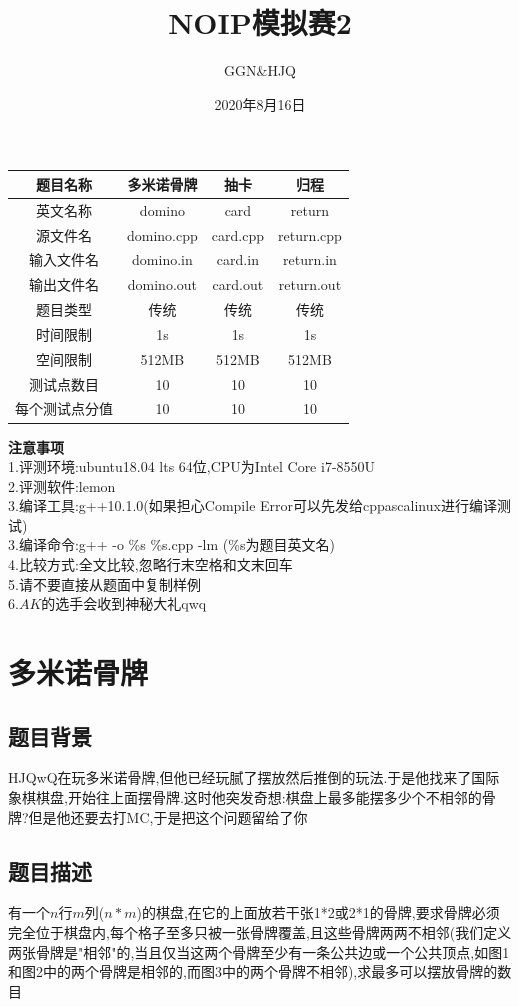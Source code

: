 \documentclass[12pt]{ctexart}
\title{\textbf{NOIP模拟赛2}}
\author{GGN\&HJQ}
\date{2020年8月16日}
\begin{document}
	\maketitle
	\begin{center}
		\begin{tabular}{|c|c|c|c|}
			\hline 题目名称&多米诺骨牌&抽卡&归程\\
			\hline 英文名称&domino&card&return\\
			\hline 源文件名&domino.cpp&card.cpp&return.cpp\\
			\hline 输入文件名&domino.in&card.in&return.in\\
			\hline 输出文件名&domino.out&card.out&return.out\\
			\hline 题目类型&传统&传统&传统\\
			\hline 时间限制&1s&1s&1s\\
			\hline 空间限制&512MB&512MB&512MB\\
			\hline 测试点数目&10&10&10\\
			\hline 每个测试点分值&10&10&10\\
			\hline
		\end{tabular}
	\end{center}
	\textbf{注意事项}\\
	1.评测环境:ubuntu18.04 lts 64位,CPU为Intel Core i7-8550U\\
	2.评测软件:lemon\\
	3.编译工具:g++10.1.0(如果担心Compile Error可以先发给cppascalinux进行编译测试)\\
	3.编译命令:g++ -o \%s \%s.cpp -lm (\%s为题目英文名)\\
	4.比较方式:全文比较,忽略行末空格和文末回车\\
	5.请不要直接从题面中复制样例\\
	6.$AK$的选手会收到神秘大礼qwq
	\newpage
	\section{多米诺骨牌}
	\subsection{题目背景}
	HJQwQ在玩多米诺骨牌,但他已经玩腻了摆放然后推倒的玩法.于是他找来了国际象棋棋盘,开始往上面摆骨牌.这时他突发奇想:棋盘上最多能摆多少个不相邻的骨牌?但是他还要去打MC,于是把这个问题留给了你
	\subsection{题目描述}
	有一个$n$行$m$列($n*m$)的棋盘,在它的上面放若干张1*2或2*1的骨牌,要求骨牌必须完全位于棋盘内,每个格子至多只被一张骨牌覆盖,且这些骨牌两两不相邻(我们定义两张骨牌是"相邻"的,当且仅当这两个骨牌至少有一条公共边或一个公共顶点,如图1和图2中的两个骨牌是相邻的,而图3中的两个骨牌不相邻),求最多可以摆放骨牌的数目
\end{document}
